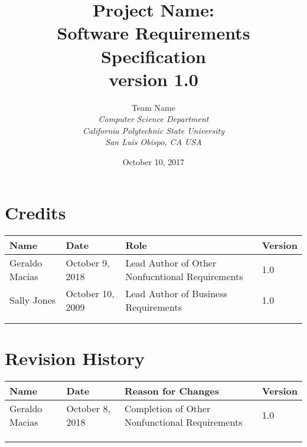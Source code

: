 \documentclass[12pt,oneside,letterpaper]{article}
\begin{document}
\title{\bfseries Project Name: \\
Software Requirements Specification\\
version 1.0}

\author {
\large{Team Name}\\
\emph{Computer Science Department}\\
\emph{California Polytechnic State University}\\
\emph{San Luis Obispo, CA USA}\\
}

\date{October 10, 2017}
\maketitle \thispagestyle{empty}


\pagebreak
\tableofcontents



\section*{Credits}
\begin{tabular}{|l|l|p{2.5in}|l|}
\hline
\textbf{Name}&\textbf{Date}&\textbf{Role}&\textbf{Version}\\
\hline
Geraldo Macias&October 9, 2018&Lead Author of Other Nonfucntional Requirements&1.0\\
\hline
Sally Jones&October 10, 2009&Lead Author of Business Requirements&1.0\\
\hline
&&&\\
\hline
&&&\\
\hline
\end{tabular}

\section*{Revision History}
\begin{tabular}{|l|l|p{2.5in}|l|}
\hline
\textbf{Name}&\textbf{Date}&\textbf{Reason for Changes}&\textbf{Version}\\
\hline
Geraldo Macias&October 8, 2018&Completion of Other Nonfunctional Requirements&1.0\\
\hline
&&&\\
\hline
&&&\\
\hline
&&&\\
\hline
\end{tabular}
\end{document}
